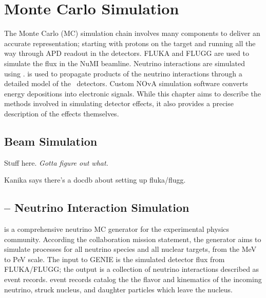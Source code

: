 \chapter{Monte Carlo Simulation}
\label{sim_chapter}


The \nova Monte Carlo (MC) simulation chain involves many components to deliver an accurate representation; starting with protons on the \numi target and running all the way through APD readout in the \nova detectors.  FLUKA and FLUGG are used to simulate the flux in the NuMI beamline.  \cite{fluka}  Neutrino interactions are simulated using \genie. \cite{genie}  \geant is used to propagate products of the neutrino interactions through a detailed model of the \nova~detectors. \cite{geant}  Custom NOvA simulation software converts energy depositions into electronic signals.  While this chapter aims to describe the methods involved in simulating detector effects, it also provides a precise description of the effects themselves.


\section{Beam Simulation}


Stuff here.  \textit{Gotta figure out what.}

Kanika says there's a docdb about setting up fluka/flugg. 

\section{\genie -- Neutrino Interaction Simulation}
\label{genie_section}

\genie is a comprehensive neutrino MC generator for the experimental physics community.  According the \genie collaboration mission statement, the generator aims to simulate processes  for all neutrino species and all nuclear targets, from the MeV to PeV scale.  The input to GENIE is the simulated detector flux from FLUKA/FLUGG; the output is a collection of neutrino interactions described as \genie event records.  \genie event records catalog the the flavor and kinematics of the incoming neutrino, struck nucleus, and daughter particles which leave the nucleus.

